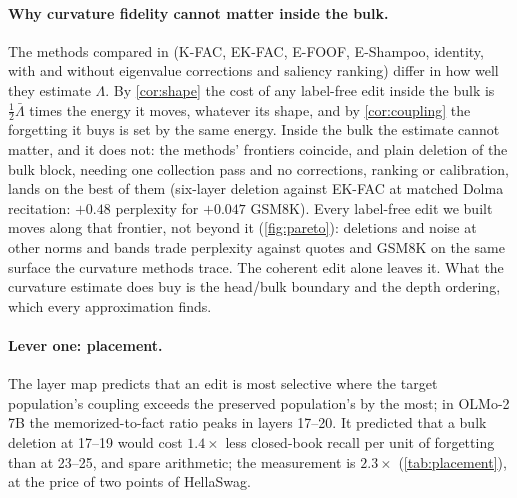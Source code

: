 \documentclass{article}
\theoremstyle{definition}\newtheorem{law}{Empirical law}
\begin{document}
\paragraph{Why curvature fidelity cannot matter inside the bulk.} The methods compared in \citet{habo2026} (K-FAC, EK-FAC, E-FOOF, E-Shampoo, identity, with and without eigenvalue corrections and saliency ranking) differ in how well they estimate $\Lambda$. By \cref{cor:shape} the cost of any label-free edit inside the bulk is $\tfrac12\bar\Lambda$ times the energy it moves, whatever its shape, and by \cref{cor:coupling} the forgetting it buys is set by the same energy. Inside the bulk the estimate cannot matter, and it does not: the methods' frontiers coincide, and plain deletion of the bulk block, needing one collection pass and no corrections, ranking or calibration, lands on the best of them (six-layer deletion against EK-FAC at matched Dolma recitation: $+0.48$ perplexity for $+0.047$ GSM8K). Every label-free edit we built moves along that frontier, not beyond it (\cref{fig:pareto}): deletions and noise at other norms and bands trade perplexity against quotes and GSM8K on the same surface the curvature methods trace. The coherent edit alone leaves it. What the curvature estimate does buy is the head/bulk boundary and the depth ordering, which every approximation finds.

\paragraph{Lever one: placement.} The layer map predicts that an edit is most selective where the target population's coupling exceeds the preserved population's by the most; in OLMo-2 7B the memorized-to-fact ratio peaks in layers 17--20. It predicted that a bulk deletion at 17--19 would cost $1.4\times$ less closed-book recall per unit of forgetting than at 23--25, and spare arithmetic; the measurement is $2.3\times$ (\cref{tab:placement}), at the price of two points of HellaSwag.
\end{document}
